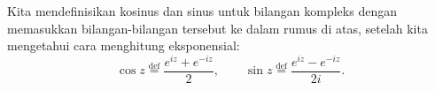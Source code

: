 
Kita mendefinisikan kosinus dan sinus untuk bilangan kompleks dengan memasukkan
bilangan-bilangan tersebut ke dalam rumus di atas, setelah kita mengetahui cara
menghitung eksponensial:
\begin{equation*}
\cos z \overset{\text{def}}{=} \frac{e^{iz}+e^{-iz}}{2} ,
\qquad
\sin z \overset{\text{def}}{=} \frac{e^{iz}-e^{-iz}}{2i} .
\end{equation*}
